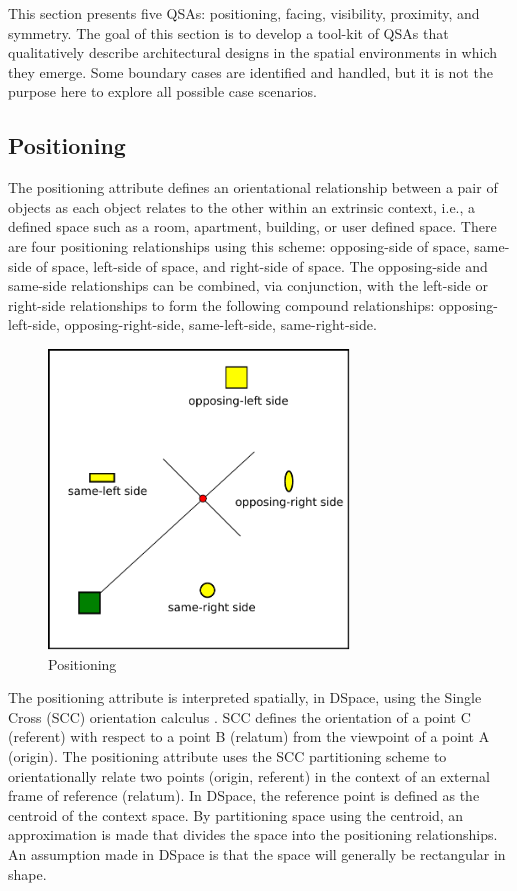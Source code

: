 \documentclass[12pt]{ucthesis}
\begin{document}
This section presents five QSAs: positioning, facing, visibility, proximity, and symmetry. The goal of this section is to develop a tool-kit of QSAs that qualitatively describe architectural designs in the spatial environments in which they emerge. Some boundary cases are identified and handled, but it is not the purpose here to explore all possible case scenarios.

\subsection{Positioning}
The positioning attribute defines an orientational relationship between a pair of objects as each object relates to the other within an extrinsic context, i.e., a defined space such as a room, apartment, building, or user defined space. There are four positioning relationships using this scheme: opposing-side of space, same-side of space, left-side of space, and right-side of space. The opposing-side and same-side relationships can be combined, via conjunction, with the left-side or right-side relationships to form the following compound relationships: opposing-left-side, opposing-right-side, same-left-side, same-right-side.

\begin{figure}[H]
\centering
\includegraphics[width=80mm]{position}
\caption{Positioning}
\label{position}
\end{figure}

The positioning attribute is interpreted spatially, in DSpace, using the Single Cross (SCC) orientation calculus \cite{Freksa92usingorientation}. SCC defines the orientation of a point C (referent) with respect to a point B (relatum) from the viewpoint of a point A (origin). The positioning attribute uses the SCC partitioning scheme to orientationally relate two points (origin, referent) in the context of an external frame of reference (relatum). In DSpace, the reference point is defined as the centroid of the context space. By partitioning space using the centroid, an approximation is made that divides the space into the positioning relationships. An assumption made in DSpace is that the space will generally be rectangular in shape.
\end{document}
